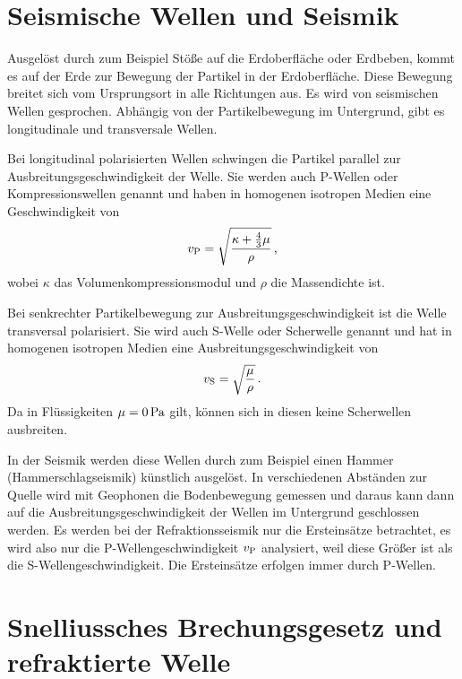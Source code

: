 \section{Seismische Wellen und Seismik}

Ausgelöst durch zum Beispiel Stöße auf die Erdoberfläche oder Erdbeben, kommt es auf der Erde zur Bewegung der Partikel in der Erdoberfläche. Diese Bewegung breitet sich vom Ursprungsort in alle Richtungen aus. Es wird von seismischen Wellen gesprochen. Abhängig von der Partikelbewegung im Untergrund, gibt es longitudinale und transversale Wellen.

Bei longitudinal polarisierten Wellen schwingen die Partikel parallel zur Ausbreitungsgeschwindigkeit der Welle. Sie werden auch P-Wellen oder Kompressionswellen genannt und haben in homogenen isotropen Medien eine Geschwindigkeit von
\begin{equation}
 v_{\mathrm{P}}=\sqrt{\frac{\kappa+\frac{4}{3}\mu}{\rho}} \text{\,,}
\end{equation}
wobei $\kappa$ das Volumenkompressionsmodul und $\rho$ die Massendichte ist.

Bei senkrechter Partikelbewegung zur Ausbreitungsgeschwindigkeit ist die Welle transversal polarisiert. Sie wird auch S-Welle oder Scherwelle genannt und hat in homogenen isotropen Medien eine Ausbreitungsgeschwindigkeit von
\begin{equation}
 v_{\mathrm{S}}=\sqrt{\frac{\mu}{\rho}} \text{\,.}
\end{equation}
Da in Flüssigkeiten $\mu=0\,\mathrm{Pa}$ gilt, können sich in diesen keine Scherwellen ausbreiten.

In der Seismik werden diese Wellen durch zum Beispiel einen Hammer (Hammerschlagseismik) künstlich ausgelöst. In verschiedenen Abständen zur Quelle wird mit  Geophonen die Bodenbewegung gemessen und daraus kann dann auf die Ausbreitungsgeschwindigkeit der Wellen im Untergrund geschlossen werden. Es werden bei der Refraktionsseismik nur die Ersteinsätze betrachtet, es wird also nur die P-Wellengeschwindigkeit $v_{\mathrm{P}}$ analysiert, weil diese Größer ist als die S-Wellengeschwindigkeit. Die Ersteinsätze erfolgen immer durch P-Wellen.

\section{Snelliussches Brechungsgesetz und refraktierte Welle} %

